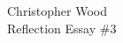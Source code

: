 \documentclass[12pt,letterpaper]{article}
\begin{document}
\begin{center}
Christopher Wood \\
Reflection Essay \#3 \\
\end{center}




\end{document}
